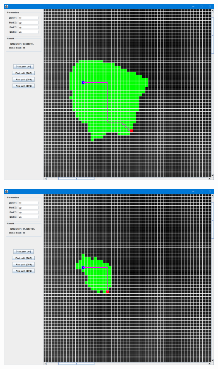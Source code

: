 \documentclass[
]{article}
\begin{document}
\begin{itemize}
\begin{itemize}
\begin{itemize}
      \begin{figure}
      \centering
      \includegraphics{./images/image-20210523083353747.png}
      \caption{}
      \end{figure}

      \begin{figure}
      \centering
      \includegraphics{./images/image-20210523083415438.png}
      \caption{}
      \end{figure}
    \end{itemize}
  \end{itemize}
\end{itemize}
\end{document}
